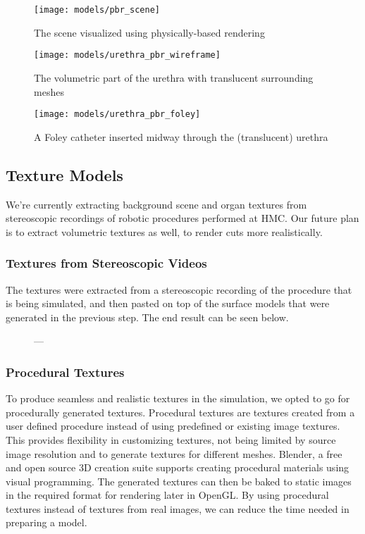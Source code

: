 \begin{figure}
  \centering
  \texttt{[image: models/pbr\_scene]}
  \caption{The scene visualized using physically-based rendering}
  \label{fig:pbr_scene}
\end{figure}

\begin{figure}
  \centering
  \texttt{[image: models/urethra\_pbr\_wireframe]}
  \caption{The volumetric part of the urethra with translucent surrounding meshes}
  \label{fig:urethra_pbr_wireframe}
\end{figure}

\begin{figure}
  \centering
  \texttt{[image: models/urethra\_pbr\_foley]}
  \caption{A Foley catheter inserted midway through the (translucent) urethra}
  \label{fig:urethra_pbr_foley}
\end{figure}

\subsection{Texture Models}
We're currently extracting background scene and organ textures from stereoscopic recordings of robotic procedures performed at HMC. Our future plan is to extract volumetric textures as well, to render cuts more realistically.


\subsubsection{Textures from Stereoscopic Videos}
\label{sssec:videos}
The textures were extracted from a stereoscopic recording of the procedure that is being simulated, and then pasted on top of the surface models that were generated in the previous step. The end result can be seen below.

\begin{figure}
  \centering%
  \setlength{\fboxsep}{0pt}%
  \setlength{\fboxrule}{0.1pt}%
  \hfill%
  \caption{---}
  \label{fig:texture_videos}
\end{figure}

\subsubsection{Procedural Textures}
\label{sssec:procedural}
To produce seamless and realistic textures in the simulation, we opted to go for procedurally generated textures. Procedural textures are textures created from a user defined procedure instead of using predefined or existing image textures. This provides flexibility in customizing textures, not being limited by source image resolution and to generate textures for different meshes. Blender, a free and open source 3D creation suite supports creating procedural materials using visual programming. The generated textures can then be baked to static images in the required format for rendering later in OpenGL. By using procedural textures instead of textures from real images, we can reduce the time needed in preparing a model.

